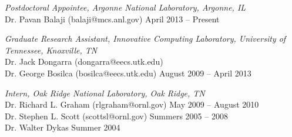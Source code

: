 {\sl Postdoctoral Appointee, Argonne National Laboratory, Argonne, IL} \\
Dr. Pavan Balaji (balaji@mcs.anl.gov) \hfill April 2013 -- Present

\vspace{0.1in}
{\sl Graduate Research Assistant, Innovative Computing Laboratory, University of Tennessee, Knoxville, TN} \\
Dr. Jack Dongarra (dongarra@eecs.utk.edu) \\
Dr. George Bosilca (bosilca@eecs.utk.edu) \hfill August 2009 -- April 2013

\vspace{0.1in}
{\sl Intern, Oak Ridge National Laboratory, Oak Ridge, TN} \\
Dr. Richard L. Graham (rlgraham@ornl.gov) \hfill May 2009 -- August 2010 \\
Dr. Stephen L. Scott (scottsl@ornl.gov) \hfill Summers 2005 -- 2008 \\
Dr. Walter Dykas \hfill Summer 2004

